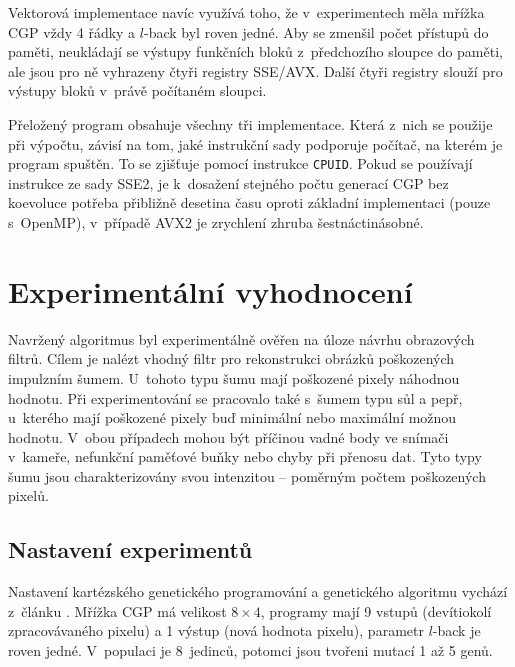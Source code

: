 \documentclass[czech]{ExcelAtFIT} %
\begin{document}
Vektorová implementace navíc využívá toho, že v~experimentech měla mřížka CGP vždy 4 řádky a \mbox{$l$-back} byl roven jedné. Aby se zmenšil počet přístupů do paměti, neukládají se výstupy funkčních bloků z~předchozího sloupce do paměti, ale jsou pro ně vyhrazeny čtyři registry SSE/AVX. Další čtyři registry slouží pro výstupy bloků v~právě počítaném sloupci.

Přeložený program obsahuje všechny tři implementace. Která z~nich se použije při výpočtu, závisí na tom, jaké instrukční sady podporuje počítač, na kterém je program spuštěn. To se zjišťuje pomocí instrukce \texttt{CPUID}. Pokud se používají instrukce ze sady SSE2, je k~dosažení stejného počtu generací CGP bez koevoluce potřeba přibližně desetina času oproti základní implementaci (pouze s~OpenMP), v~případě AVX2 je zrychlení zhruba šest\-nác\-ti\-ná\-sobné.

\section{Experimentální vyhodnocení}
\label{sec:Experimental}

Navržený algoritmus byl experimentálně ověřen na úloze návrhu obrazových filtrů. Cílem je nalézt vhodný filtr pro rekonstrukci obrázků poškozených impulzním šumem. U~tohoto typu šumu mají poškozené pixely náhodnou hodnotu. Při experimentování se pra\-co\-valo také s~šumem typu sůl a pepř, u~kterého mají poškozené pixely buď minimální nebo maximální možnou hodnotu. V~obou případech mohou být příčinou vadné body ve snímači v~kameře, nefunkční paměťové buňky nebo chyby při přenosu dat. Tyto typy šumu jsou charakterizovány svou in\-ten\-zi\-tou -- poměrným poč\-tem poškozených pixelů.

\subsection{Nastavení experimentů}

Nastavení kartézského genetického programování a genetického algoritmu vychází z~článku \cite{SikuPPSN}. Mřížka CGP má velikost $8 \times 4$, programy mají 9 vstupů (devíti\-okolí zpracovávaného pixelu) a 1 výstup (nová hodnota pixelu), parametr $l$-back je roven jedné. V~populaci je 8~jedinců, potomci jsou tvořeni mutací 1 až 5 genů.
\end{document}
